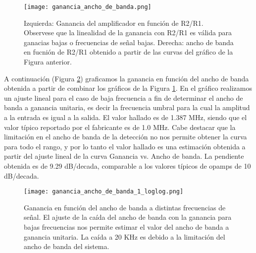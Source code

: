 \documentclass[a4paper, 11pt]{article}
\begin{document}
\begin{figure} [H]
\centering
\texttt{[image: ganancia\_ancho\_de\_banda.png]}
\caption{ Izquierda: Ganancia del amplificador en función de R2/R1. Observese que la linealidad de la ganancia con R2/R1 es válida para ganacias bajas o frecuencias de señal bajas. Derecha: ancho de banda en fucnión de R2/R1 obtenido a partir de las curvas del gráfico de la Figura anterior. \label{fig:ganancia_ancho_de_banda}}
\end{figure} 

A continuación (Figura \ref{fig:ganancia_ancho_de_banda_1_loglog}) graficamos la ganancia en función del ancho de banda obtenida a partir de combinar los gráficos de la Figura \ref{fig:ganancia_ancho_de_banda}. En el gráfico realizamos un ajuste lineal para el caso de baja frecuencia a fin de determinar el ancho de banda a ganancia unitaria, es decir la frecuencia umbral para la cual la amplitud a la entrada es igual a la salida.
El valor hallado es de 1.387 MHz, siendo que el valor típico reportado por el fabricante es de 1.0 MHz. Cabe destacar que la limitación en el ancho de banda de la detección no nos permite obtener la curva para todo el rango, y por lo tanto el valor hallado es una estimación obtenida a partir del ajuste lineal de la curva Ganancia vs. Ancho de banda. La pendiente obtenida es de 9.29 dB/decada, comparable a los valores típicos de opamps de 10 dB/decada.

\begin{figure} [H]
\centering
\texttt{[image: ganancia\_ancho\_de\_banda\_1\_loglog.png]}
\caption{Ganancia en función del ancho de banda a distintas frecuencias de señal. El ajuste de la caída del ancho de banda con la ganancia para bajas frecuencias nos permite estimar el valor del ancho de banda a ganancia unitaria. La caída a 20 KHz es debido a la limitación del ancho de banda del sistema. \label{fig:ganancia_ancho_de_banda_1_loglog}}
\end{figure} 


%
%
\end{document}
